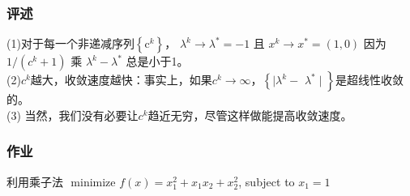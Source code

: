\documentclass[handout,10pt]{beamer} %
\begin{document}
\begin{frame}
\frametitle{评述}
(1)对于每一个非递减序列$\left\{\mathrm{c}^{k}\right\}$， $\lambda^{k} \rightarrow \lambda^{*}=-1$ 且 $x^{k} \rightarrow x^{*}=(1,0)$  因为 $1 /\left(c^{k}+1\right)$ 乘 $\lambda^{k}-\lambda^{*}$ 总是小于1。\\
(2)$c^{k}$越大，收敛速度越快：事实上，如果$c^{k} \rightarrow \infty$，$\left\{\mid \lambda^{k}-\right.$ $\left.\lambda^{*} \mid\right\}$是超线性收敛的。\\
(3) 当然，我们没有必要让$c^{k}$趋近无穷，尽管这样做能提高收敛速度。


\end{frame}




\begin{frame}
\frametitle{作业}

\bigskip
\centering
利用乘子法
$\text { minimize } f(x)=x_{1}^{2}+x_{1}x_{2}+x_{2}^{2}$, subject to $x_{1}=1$\\

\end{frame}



\end{document}
